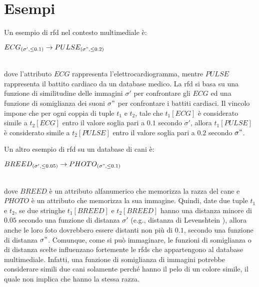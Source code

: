 \section{Esempi}
Un esempio di \acrshort{rfd} nel contesto multimediale \`{e}:
\\\centerline{$ECG_{(\sigma',\leq0.1)}\rightarrow PULSE_{(\sigma",\leq0.2)}$}
\\dove l'attributo $ECG$ rappresenta l'elettrocardiogramma, mentre $PULSE$ rappresenta il battito cardiaco da un database medico. La \acrshort{rfd} si basa su una funzione di similitudine delle immagini $\sigma'$ per confrontare gli $ECG$ ed una funzione di somiglianza dei suoni $\sigma"$ per confrontare i battiti cardiaci. Il vincolo impone che per ogni coppia di tuple $t_1$ e $t_2$, tale che $t_1[ECG]$ \`{e} considerato simile a $t_2[ECG]$ entro il valore soglia pari a $0.1$ secondo $\sigma'$, allora $t_1[PULSE]$ \`{e} considerato simile a $t_2[PULSE]$ entro il valore soglia pari a $0.2$ secondo $\sigma"$.\par
Un altro esempio di \acrshort{rfd} su un database di cani \`{e}:
\\\centerline{$BREED_{(\sigma',\leq0.05)}\rightarrow PHOTO_{(\sigma",\leq0.1)}$}
\\dove $BREED$ \`{e} un attributo alfanumerico che memorizza la razza del cane e $PHOTO$ \`{e} un attributo che memorizza la sua immagine. Quindi, date due tuple $t_1$ e $t_2$, se due stringhe $t_1[BREED]$ e $t_2[BREED]$ hanno una distanza minore di $0.05$ secondo una funzione di distanza $\sigma'$ (e.g., distanza di Levenshtein \cite{binarycodes4correcting}), allora anche le loro foto dovrebbero essere distanti non pi\`{u} di $0.1$, secondo una funzione di distanza $\sigma"$. Comunque, come si pu\`{o} immaginare, le funzioni di somiglianza o di distanza scelte influenzano fortemente le \acrshort{rfds} che appartengono al database multimediale. Infatti, una funzione di somiglianza di immagini potrebbe considerare simili due cani solamente perch\'{e} hanno il pelo di un colore simile, il quale non implica che hanno la stessa razza.\par

